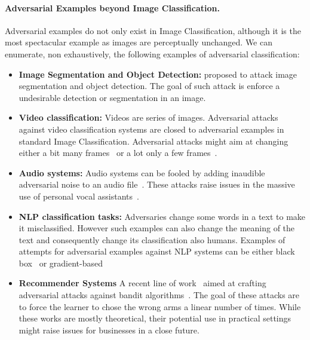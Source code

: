 \paragraph{Adversarial Examples beyond Image Classification.} Adversarial examples do not only exist in Image Classification, although it is the most spectacular example as images are perceptually unchanged. We can enumerate, non exhaustively, the following examples of adversarial classification:
\begin{itemize}
    \item \textbf{Image Segmentation and Object Detection:} \cite{xie2017adversarial} proposed to attack image segmentation and object detection. The goal of such attack is enforce a undesirable detection or segmentation in an image. 
    \item \textbf{Video classification:} Videos are series of images. Adversarial attacks against video classification systems are closed to adversarial examples in standard Image Classification. Adversarial attacks might aim at changing either a bit many frames~\citep{jiang2019black} or a lot only a few frames~\citep{mu2021sparse}. 
    \item \textbf{Audio systems:} Audio systems can be fooled by adding inaudible adversarial noise to an audio file~\citep{carlini2018audio}. These attacks raise issues in the massive use of personal vocal assistants~\citep{zhang2019dangerous}. 
    \item \textbf{NLP classification tasks:} Adversaries change some words in a text to make it misclassified. However such examples can also change the meaning of the text and consequently change its classification also humans. Examples of attempts for adversarial examples against NLP systems can be either black box~\citep{jin2019bert,li2020bert} or gradient-based~\citep{guo2021gradient}
    \item \textbf{Recommender Systems} A recent line of work~\cite{jun2018adversarial,liu2019data,garcelon2020adversarial} aimed at crafting adversarial attacks against bandit algorithms~\citep{lattimore2018bandit}. The goal of these attacks are to force the learner to chose the wrong arms a linear number of times. While these works are mostly theoretical, their potential use in practical settings might raise issues for businesses in a close future.
\end{itemize}



